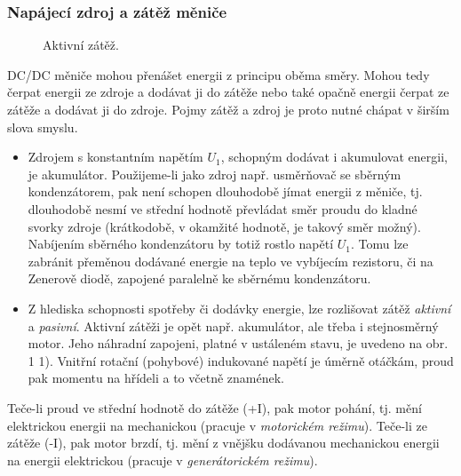       \subsubsection{Napájecí zdroj a zátěž měniče}
        \begin{figure}[b]
          \centering
           \hfill 
          \caption{Aktivní zátěž.}
          \label{enz:fig_aktivni_zatez}
        \end{figure}
        DC/DC měniče mohou přenášet energii z principu oběma směry. Mohou tedy čerpat energii ze
        zdroje a dodávat ji do zátěže nebo také opačně energii čerpat ze zátěže a dodávat ji do
        zdroje. Pojmy zátěž a zdroj je proto nutné chápat v širším slova smyslu.
        \begin{itemize}
          \item Zdrojem s konstantním napětím $U_1$, schopným dodávat i akumulovat energii, je
                akumulátor. Použijeme-li jako zdroj např. usměrňovač se sběrným kondenzátorem, pak
                není schopen dlouhodobě jímat energii z měniče, tj. dlouhodobě nesmí ve střední
                hodnotě převládat směr proudu do kladné svorky zdroje (krátkodobě, v okamžité
                hodnotě, je takový směr možný). Nabíjením sběrného kondenzátoru by totiž rostlo
                napětí $U_1$. Tomu lze zabránit přeměnou dodávané energie na teplo ve vybíjecím
                rezistoru, či na Zenerově diodě, zapojené paralelně ke sběrnému kondenzátoru.
          \item Z hlediska schopnosti spotřeby či dodávky energie, lze rozlišovat zátěž
                \emph{aktivní} a \emph{pasivní}. Aktivní zátěži je opět např. akumulátor, ale třeba
                i stejnosměrný motor. Jeho náhradní zapojeni, platné v ustáleném stavu, je uvedeno
                na obr. 1 1). Vnitřní rotační (pohybové) indukované napětí je úměrně otáčkám, proud
                pak momentu na hřídeli a to včetně znamének.
        \end{itemize}

        Teče-li proud ve  střední hodnotě do zátěže (+I), pak motor pohání, tj. mění elektrickou
        energii na mechanickou (pracuje v \emph{motorickém režimu}). Teče-li ze zátěže (-I), pak
        motor brzdí, tj. mění z vnějšku dodávanou mechanickou energii na energii elektrickou
       (pracuje v \emph{generátorickém režimu}).
       
